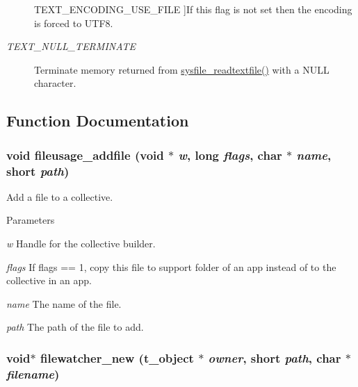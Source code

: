 \begin{Desc}
\begin{description}
{\hypertarget{group__files_gga77d70855c1424d078789b0abe6bc94cdae170ce3b6665f929791e1cfcc00d9eee}{
TEXT\_\-ENCODING\_\-USE\_\-FILE}
\label{group__files_gga77d70855c1424d078789b0abe6bc94cdae170ce3b6665f929791e1cfcc00d9eee}
}]If this flag is not set then the encoding is forced to UTF8. \item[{\em 
\hypertarget{group__files_gga77d70855c1424d078789b0abe6bc94cda134f84529c248946c91917a1e341a0db}{
TEXT\_\-NULL\_\-TERMINATE}
\label{group__files_gga77d70855c1424d078789b0abe6bc94cda134f84529c248946c91917a1e341a0db}
}]Terminate memory returned from \hyperlink{group__files_gabb35e28302ee972648e61f9a5a61b96a}{sysfile\_\-readtextfile()} with a NULL character. \end{description}
\end{Desc}



\subsection{Function Documentation}
\hypertarget{group__files_ga30ae954756330e63f7b70fd5d312a90b}{
\subsubsection[{fileusage\_\-addfile}]{\setlength{\rightskip}{0pt plus 5cm}void fileusage\_\-addfile (void $\ast$ {\em w}, \/  long {\em flags}, \/  char $\ast$ {\em name}, \/  short {\em path})}}
\label{group__files_ga30ae954756330e63f7b70fd5d312a90b}


Add a file to a collective. 
\begin{DoxyParams}{Parameters}
\item[{\em w}]Handle for the collective builder. \item[{\em flags}]If flags == 1, copy this file to support folder of an app instead of to the collective in an app. \item[{\em name}]The name of the file. \item[{\em path}]The path of the file to add. \end{DoxyParams}
\hypertarget{group__files_gab81ffeda175d0b35f112d8f21ba6e819}{
\subsubsection[{filewatcher\_\-new}]{\setlength{\rightskip}{0pt plus 5cm}void$\ast$ filewatcher\_\-new ({\bf t\_\-object} $\ast$ {\em owner}, \/  short {\em path}, \/  char $\ast$ {\em filename})}}
\label{group__files_gab81ffeda175d0b35f112d8f21ba6e819}


